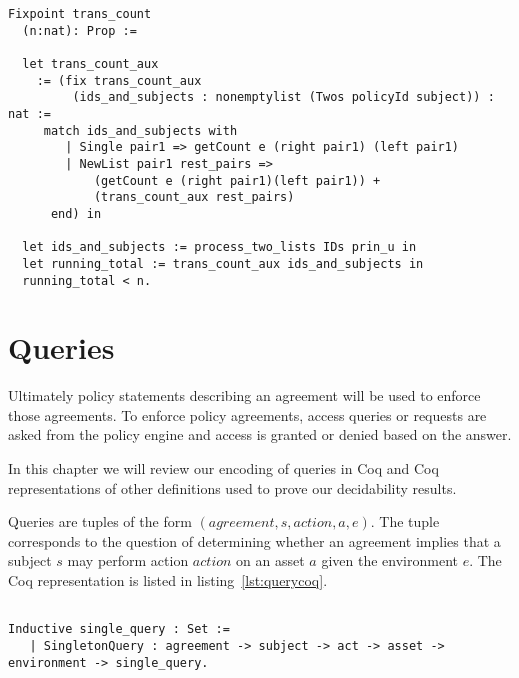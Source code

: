 \begin{minipage}[c]{0.95\textwidth}
\begin{lstlisting}
Fixpoint trans_count 
  (n:nat): Prop := 

  let trans_count_aux 
    := (fix trans_count_aux
         (ids_and_subjects : nonemptylist (Twos policyId subject)) : nat :=
     match ids_and_subjects with
        | Single pair1 => getCount e (right pair1) (left pair1)
        | NewList pair1 rest_pairs =>
            (getCount e (right pair1)(left pair1)) +
            (trans_count_aux rest_pairs)
      end) in
  
  let ids_and_subjects := process_two_lists IDs prin_u in
  let running_total := trans_count_aux ids_and_subjects in
  running_total < n.
\end{lstlisting}
\end{minipage}

\section{Queries}

Ultimately policy statements describing an agreement will be used to enforce those agreements. To enforce policy agreements, access queries or requests are asked from the policy engine and access is granted or denied based on the answer.

In this chapter we will review our encoding of queries in Coq and Coq representations of other definitions used to prove our decidability results.

Queries are tuples of the form $(agreement, s, action, a, e)$. The tuple corresponds to the question of determining whether an agreement implies that a subject $s$ may perform action $action$ on an asset $a$ given the environment $e$. The Coq representation is listed in listing~\ref{lst:querycoq}. 

\begin{minipage}[c]{0.95\textwidth}
\begin{lstlisting}

Inductive single_query : Set := 
   | SingletonQuery : agreement -> subject -> act -> asset -> environment -> single_query.
   
\end{lstlisting}
\end{minipage}

